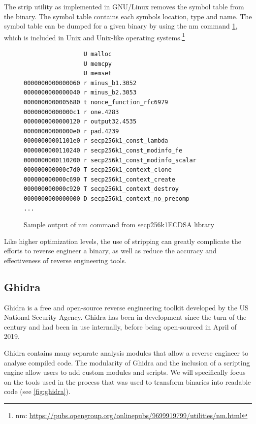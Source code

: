 The strip utility as implemented in GNU/Linux removes the symbol table from the binary. The symbol table contains each symbols location, type and name. The symbol table can be dumped for a given binary by using the nm command \ref{fig:nm}, which is included in Unix and Unix-like operating systems.\footnote{nm: \url{https://pubs.opengroup.org/onlinepubs/9699919799/utilities/nm.html}}

\begin{figure}[!h]
  \centering
\begin{lstlisting}
                 U malloc
                 U memcpy
                 U memset
0000000000000060 r minus_b1.3052
0000000000000040 r minus_b2.3053
0000000000005680 t nonce_function_rfc6979
00000000000000c1 r one.4283
0000000000000120 r output32.4535
00000000000000e0 r pad.4239
00000000001101e0 r secp256k1_const_lambda
0000000000110240 r secp256k1_const_modinfo_fe
0000000000110200 r secp256k1_const_modinfo_scalar
000000000000c7d0 T secp256k1_context_clone
000000000000c690 T secp256k1_context_create
000000000000c920 T secp256k1_context_destroy
0000000000000000 D secp256k1_context_no_precomp
...
\end{lstlisting}
  \caption[secp256k1]{Sample output of nm command from secp256k1\footnotemark ECDSA library}
  \label{fig:nm}
\end{figure}

Like higher optimization levels, the use of stripping can greatly complicate the efforts to reverse engineer a binary, as well as reduce the accuracy and effectiveness of reverse engineering tools. 
\newpage
\subsection{Ghidra}
Ghidra is a free and open-source reverse engineering toolkit developed by the US National Security Agency. Ghidra has been in development since the turn of the century and had been in use internally, before being open-sourced in April of 2019. 

Ghidra contains many separate analysis modules that allow a reverse engineer to analyse compiled code. The modularity of Ghidra and the inclusion of a scripting engine allow users to add custom modules and scripts. We will specifically focus on the tools used in the process that was used to transform binaries into readable code (see \ref{fig:ghidra}).



